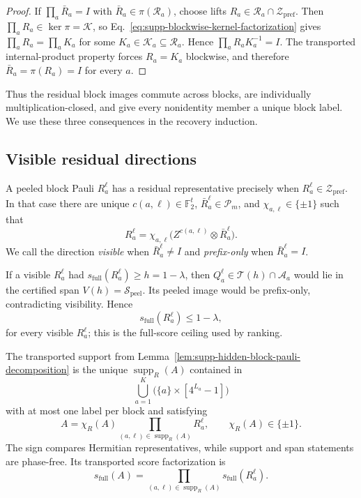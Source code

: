\documentclass[
  aps,
  prx,
  reprint,
  superscriptaddress,
  amsmath,
  amssymb,
  nofootinbib,
  longbibliography
]{revtex4-2}
\newcommand{\supp}{\operatorname{supp}}
\newcommand{\Pc}{\mathcal{P}}
\newcommand{\Fc}{\mathbb{F}_2}
\begin{document}
\begin{proof}
If $\prod_a\bar R_a=I$ with
$\bar R_a\in\pi(\mathcal R_a)$, choose lifts
$R_a\in\mathcal R_a\cap\mathcal Z_{\mathrm{pref}}$.  Then
$\prod_aR_a\in\ker\pi=\mathcal K$, so
Eq.~\eqref{eq:supp-blockwise-kernel-factorization} gives
$\prod_aR_a=\prod_aK_a$ for some
$K_a\in\mathcal K_a\subseteq\mathcal R_a$.  Hence
$\prod_aR_aK_a^{-1}=I$.  The transported internal-product property forces
$R_a=K_a$ blockwise, and therefore $\bar R_a=\pi(R_a)=I$ for every $a$.
\end{proof}

Thus the residual block images commute across blocks, are individually
multiplication-closed, and give every nonidentity member a unique block
label.  We use these three consequences in the recovery induction.


\subsection{Visible residual directions}

A peeled block Pauli $R_a^\ell$ has a residual representative precisely
when $R_a^\ell\in\mathcal Z_{\mathrm{pref}}$.  In that case there are unique
$c(a,\ell)\in\Fc^t$, $\bar R_a^\ell\in\Pc_m$, and
$\chi_{a,\ell}\in\{\pm1\}$ such that
\begin{equation}
R_a^\ell
=
\chi_{a,\ell}
\bigl(Z^{c(a,\ell)}\otimes\bar R_a^\ell\bigr).
\label{eq:supp-visible-residual-representative}
\end{equation}
We call the direction \emph{visible} when $\bar R_a^\ell\ne I$ and
\emph{prefix-only} when $\bar R_a^\ell=I$.

If a visible $R_a^\ell$ had
$s_{\mathrm{full}}(R_a^\ell)\ge h=1-\lambda$, then
$Q_a^\ell\in\mathcal T(h)\cap\mathcal A_a$ would lie in the certified span
$V(h)=\mathcal S_{\mathrm{peel}}$.  Its peeled image would be prefix-only,
contradicting visibility.  Hence
\begin{equation}
s_{\mathrm{full}}(R_a^\ell)
\le
1-\lambda,
\label{eq:supp-post-peeling-upper-block}
\end{equation}
for every visible $R_a^\ell$; this is the full-score ceiling used by
ranking.

The transported support from
Lemma~\ref{lem:supp-hidden-block-pauli-decomposition} is the unique
$\supp_R(A)$ contained in
\begin{equation}
\bigcup_{a=1}^K
\bigl(\{a\}\times[4^{L_a}-1]\bigr)
\label{eq:supp-R-support-domain}
\end{equation}
with at most one label per block and satisfying
\begin{equation}
A
=
\chi_R(A)
\prod_{(a,\ell)\in\supp_R(A)}R_a^\ell,
\qquad
\chi_R(A)\in\{\pm1\}.
\label{eq:supp-block-proof-support-decomp}
\end{equation}
The sign compares Hermitian
representatives, while support and span statements are phase-free.  Its
transported score factorization is
\begin{equation}
s_{\mathrm{full}}(A)
=
\prod_{(a,\ell)\in\supp_R(A)}
s_{\mathrm{full}}(R_a^\ell).
\label{eq:supp-high-score-visible-decomp-factorization}
\end{equation}
\end{document}
